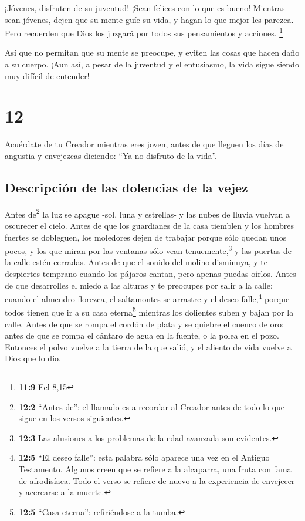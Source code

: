  ¡Jóvenes, disfruten de su juventud! ¡Sean felices con lo
que es bueno! Mientras sean jóvenes, dejen que su mente guíe su vida, y
hagan lo que mejor les parezca. Pero recuerden que Dios los juzgará por
todos sus pensamientos y acciones. \footnote{\textbf{11:9} Ecl 8,15}

 Así que no permitan que su mente se preocupe, y eviten
las cosas que hacen daño a su cuerpo. ¡Aun así, a pesar de la juventud y
el entusiasmo, la vida sigue siendo muy difícil de entender!

\hypertarget{section-11}{%
\section{12}\label{section-11}}

 Acuérdate de tu Creador mientras eres joven, antes de que
lleguen los días de angustia y envejezcas diciendo: ``Ya no disfruto de
la vida''.

\hypertarget{descripciuxf3n-de-las-dolencias-de-la-vejez}{%
\subsection{Descripción de las dolencias de la
vejez}\label{descripciuxf3n-de-las-dolencias-de-la-vejez}}

 Antes de\footnote{\textbf{12:2} ``Antes de'': el llamado
  es a recordar al Creador antes de todo lo que sigue en los versos
  siguientes.} la luz se apague -sol, luna y estrellas- y las nubes de
lluvia vuelvan a oscurecer el cielo.  Antes de que los
guardianes de la casa tiemblen y los hombres fuertes se dobleguen, los
moledores dejen de trabajar porque sólo quedan unos pocos, y los que
miran por las ventanas sólo vean tenuemente,\footnote{\textbf{12:3} Las
  alusiones a los problemas de la edad avanzada son evidentes.}
 y las puertas de la calle estén cerradas. Antes de que el
sonido del molino disminuya, y te despiertes temprano cuando los pájaros
cantan, pero apenas puedas oírlos.  Antes de que
desarrolles el miedo a las alturas y te preocupes por salir a la calle;
cuando el almendro florezca, el saltamontes se arrastre y el deseo
falle,\footnote{\textbf{12:5} ``El deseo falle'': esta palabra sólo
  aparece una vez en el Antiguo Testamento. Algunos creen que se refiere
  a la alcaparra, una fruta con fama de afrodisíaca. Todo el verso se
  refiere de nuevo a la experiencia de envejecer y acercarse a la
  muerte.} porque todos tienen que ir a su casa eterna\footnote{\textbf{12:5}
  ``Casa eterna'': refiriéndose a la tumba.} mientras los dolientes
suben y bajan por la calle.  Antes de que se rompa el
cordón de plata y se quiebre el cuenco de oro; antes de que se rompa el
cántaro de agua en la fuente, o la polea en el pozo. 
Entonces el polvo vuelve a la tierra de la que salió, y el aliento de
vida vuelve a Dios que lo dio.

